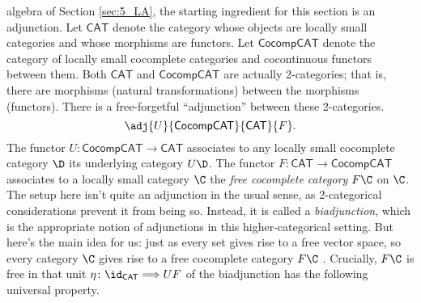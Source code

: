  algebra of Section \ref{sec:5_LA}, the starting ingredient for this section is an adjunction. Let $\mathsf{CAT}$ denote the category whose objects are locally small categories and whose morphisms are functors. Let $\mathsf{CocompCAT}$ denote the category of locally small cocomplete categories and cocontinuous functors between them. Both $\mathsf{CAT}$ and $\mathsf{CocompCAT}$ are actually 2-categories; that is, there are morphisms (natural transformations) between the morphisms (functors). There is a free-forgetful ``adjunction'' between these 2-categories.
\[\adj{U}{\mathsf{CocompCAT}}{\mathsf{CAT}}{F}.\]
The functor $U\colon \mathsf{CocompCAT}\to \mathsf{CAT}$ associates to any locally small cocomplete category $\D$ its underlying category $U\D$. The functor $F\colon \mathsf{CAT}\to\mathsf{CocompCAT}$ associates to a locally small category $\C$ the \emph{free cocomplete category} $F\C$ on $\C$. The setup here isn't quite an adjunction in the usual sense, as 2-categorical considerations prevent it from being so. Instead, it is called a \emph{biadjunction}, which is the appropriate notion of adjunctions in this higher-categorical setting. But here's the main idea for us: just as every set gives rise to a free vector space, so every category $\C$ gives rise to a free cocomplete category $F\C$ \cite{Day_2007,kelly200,nlab:free_cocompletion}. Crucially, $F\C$ is free in that unit $\eta\colon \id_{\mathsf{CAT}}\Longrightarrow UF$ of the biadjunction has the following universal property.



